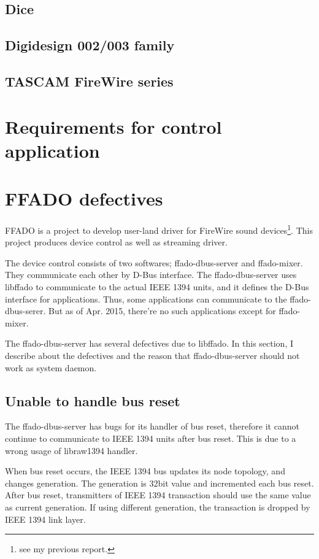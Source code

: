 \documentclass[onecolumn]{article}
\begin{document}
\subsection{Dice}

\subsection{Digidesign 002/003 family}

\subsection{TASCAM FireWire series}

\section{Requirements for control application}


\section{FFADO defectives}

FFADO is a project to develop user-land driver for FireWire sound devices\footnote{see my previous report.}. This project produces device control as well as streaming driver.

The device control consists of two softwares; ffado-dbus-server and ffado-mixer. They communicate each other by D-Bus interface. The ffado-dbus-server uses libffado to communicate to the actual IEEE 1394 units, and it defines the D-Bus interface for applications. Thus, some applications can communicate to the ffado-dbus-serer. But as of Apr. 2015, there're no such applications except for ffado-mixer.

The ffado-dbus-server has several defectives due to libffado. In this section, I describe about the defectives and the reason that ffado-dbus-server should not work as system daemon.

\subsection{Unable to handle bus reset}

The ffado-dbus-server has bugs for its handler of bus reset, therefore it cannot continue to communicate to IEEE 1394 units after bus reset. This is due to a wrong usage of libraw1394 handler.

When bus reset occurs, the IEEE 1394 bus updates its node topology, and changes generation. The generation is 32bit value and incremented each bus reset. After bus reset, transmitters of IEEE 1394 transaction should use the same value as current generation. If using different generation, the transaction is dropped by IEEE 1394 link layer.
\end{document}
